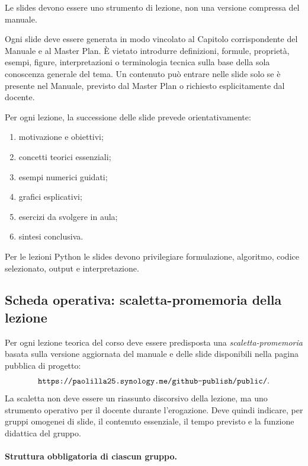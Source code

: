 \documentclass[12pt,a4paper]{article}%
\newcommand{\1}{\mathbf{1}}
\begin{document}
Le slides devono essere uno strumento di lezione, non una versione compressa
del manuale.

Ogni slide deve essere generata in modo vincolato al Capitolo corrispondente
del Manuale e al Master Plan. \`{E} vietato introdurre definizioni, formule,
propriet\`{a}, esempi, figure, interpretazioni o terminologia tecnica sulla
base della sola conoscenza generale del tema. Un contenuto pu\`{o} entrare
nelle slide solo se \`{e} presente nel Manuale, previsto dal Master Plan o
richiesto esplicitamente dal docente.

Per ogni lezione, la successione delle slide prevede orientativamente:

\begin{enumerate}
\item motivazione e obiettivi;

\item concetti teorici essenziali;

\item esempi numerici guidati;

\item grafici esplicativi;

\item esercizi da svolgere in aula;

\item sintesi conclusiva.
\end{enumerate}

Per le lezioni Python le slides devono privilegiare formulazione, algoritmo,
codice selezionato, output e interpretazione.

\subsection{Scheda operativa: scaletta-promemoria della lezione}

\label{subsec:scheda-scaletta-promemoria}

Per ogni lezione teorica del corso deve essere predisposta una
\emph{scaletta-promemoria} basata sulla versione aggiornata del manuale e
delle slide disponibili nella pagina pubblica di progetto:
\[
\mbox{\texttt{https://paolilla25.synology.me/github-publish/public/}}.
\]
La scaletta non deve essere un riassunto discorsivo della lezione, ma uno
strumento operativo per il docente durante l'erogazione. Deve quindi indicare,
per gruppi omogenei di slide, il contenuto essenziale, il tempo previsto e la
funzione didattica del gruppo.

\paragraph{Struttura obbligatoria di ciascun gruppo.}
\end{document}
